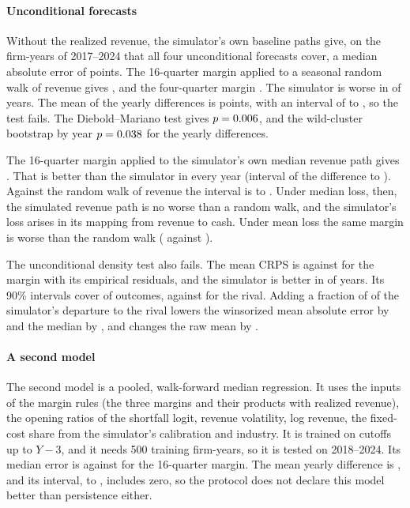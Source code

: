 \paragraph{Unconditional forecasts} Without the realized revenue, the simulator's own baseline paths give, on the \PUncCommonN{} firm-years of 2017--2024 that all four unconditional forecasts cover, a median absolute error of \PUncCMedTwin{} points. The 16-quarter margin applied to a seasonal random walk of revenue gives \PUncCMedRw, and the four-quarter margin \PUncCMedFour. The simulator is worse in \PUncWorse{} of \PUncG{} years. The mean of the yearly differences is \PUncStatMean{} points, with an interval of \PUncLo{} to \PUncHi, so the test fails. The Diebold--Mariano test gives $p=0.006$, and the wild-cluster bootstrap by year $p=0.038$ for the yearly differences.

The 16-quarter margin applied to the simulator's own median revenue path gives \PUncCMedOwn. That is better than the simulator in every year (interval of the difference \PUncOwnLo{} to \PUncOwnHi). Against the random walk of revenue the interval is \PUncOwnRwLo{} to \PUncOwnRwHi. Under median loss, then, the simulated revenue path is no worse than a random walk, and the simulator's loss arises in its mapping from revenue to cash. Under mean loss the same margin is worse than the random walk (\PUncCMeanOwn{} against \PUncCMeanRw).

The unconditional density test also fails. The mean CRPS is \PUncCrpsTwin{} against \PUncCrpsRival{} for the margin with its empirical residuals, and the simulator is better in \PUncDenBetter{} of \PUncDenYears{} years. Its 90\% intervals cover \PUncCovTwin{} of outcomes, against \PUncCovRival{} for the rival. Adding a fraction of \PUncW{} of the simulator's departure to the rival lowers the winsorized mean absolute error by \PUncGainW{} and the median by \PUncGainMed, and changes the raw mean by \PUncGainRaw.

\paragraph{A second model} The second model is a pooled, walk-forward median regression. It uses the inputs of the margin rules (the three margins and their products with realized revenue), the opening ratios of the shortfall logit, revenue volatility, log revenue, the fixed-cost share from the simulator's calibration and industry. It is trained on cutoffs up to $Y-3$, and it needs 500 training firm-years, so it is tested on 2018--2024. Its median error is \PMlMed{} against \PMlMedNthree{} for the 16-quarter margin. The mean yearly difference is \PMlStatMean{}, and its interval, \PMlLo{} to \PMlHi, includes zero, so the protocol does not declare this model better than persistence either.

